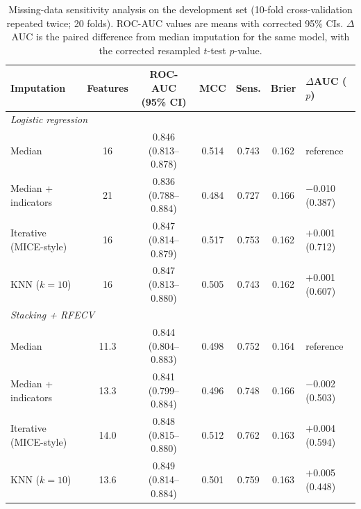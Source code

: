 \documentclass[preprint,12pt,authoryear=false]{elsarticle}
\begin{document}
\begin{table}[!htbp]
\centering
\caption{Missing-data sensitivity analysis on the development set (10-fold cross-validation repeated twice; 20 folds). ROC-AUC values are means with corrected 95\% CIs. $\Delta$AUC is the paired difference from median imputation for the same model, with the corrected resampled $t$-test $p$-value.}
\label{tab:missing}
\scriptsize
\setlength{\tabcolsep}{3.5pt}
\begin{tabular}{lcccccl}
\toprule
Imputation & Features & ROC-AUC (95\% CI) & MCC & Sens. & Brier & $\Delta$AUC ($p$) \\
\midrule
\multicolumn{7}{l}{\textit{Logistic regression}} \\
\quad Median & 16 & 0.846 (0.813--0.878) & 0.514 & 0.743 & 0.162 & reference \\
\quad Median + indicators & 21 & 0.836 (0.788--0.884) & 0.484 & 0.727 & 0.166 & $-$0.010 (0.387) \\
\quad Iterative (MICE-style) & 16 & 0.847 (0.814--0.879) & 0.517 & 0.753 & 0.162 & $+$0.001 (0.712) \\
\quad KNN ($k=10$) & 16 & 0.847 (0.813--0.880) & 0.505 & 0.743 & 0.162 & $+$0.001 (0.607) \\
\midrule
\multicolumn{7}{l}{\textit{Stacking + RFECV}} \\
\quad Median & 11.3 & 0.844 (0.804--0.883) & 0.498 & 0.752 & 0.164 & reference \\
\quad Median + indicators & 13.3 & 0.841 (0.799--0.884) & 0.496 & 0.748 & 0.166 & $-$0.002 (0.503) \\
\quad Iterative (MICE-style) & 14.0 & 0.848 (0.815--0.880) & 0.512 & 0.762 & 0.163 & $+$0.004 (0.594) \\
\quad KNN ($k=10$) & 13.6 & 0.849 (0.814--0.884) & 0.501 & 0.759 & 0.163 & $+$0.005 (0.448) \\
\bottomrule
\end{tabular}
\end{table}

\FloatBarrier
\end{document}
